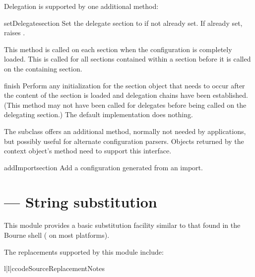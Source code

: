 \documentclass{howto}
\begin{document}
Delegation is supported by one additional method:

\begin{methoddesc}[Configuration]{setDelegate}{section}
  Set the delegate section to  if not already set.  If
  already set, raises .
\end{methoddesc}

This method is called on each section when the configuration is
completely loaded.  This is called for all sections contained within a
section before it is called on the containing section.

\begin{methoddesc}[Configuration]{finish}{}
  Perform any initialization for the section object that needs to
  occur after the content of the section is loaded and delegation
  chains have been established.  (This method may not have been called
  for delegates before being called on the delegating section.)  The
  default implementation does nothing.
\end{methoddesc}

The  subclass offers an additional
method, normally not needed by applications, but possibly useful for
alternate configuration parsers.  Objects returned by the
context object's  method need to
support this interface.

\begin{methoddesc}[ImportingConfiguration]{addImport}{section}
  Add a configuration generated from an import.
\end{methoddesc}


\section{ --- String substitution}


This module provides a basic substitution facility similar to that
found in the Bourne shell ( on most \UNIX{} platforms).  

The replacements supported by this module include:

\begin{tableiii}{l|l|c}{code}{Source}{Replacement}{Notes}
\end{tableiii}
\end{document}
